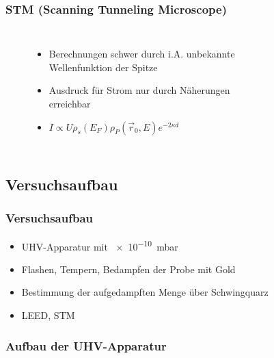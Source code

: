 \documentclass{beamer}
\begin{document}
\begin{frame}
\frametitle{STM (Scanning Tunneling Microscope)}
	 \begin{columns}
\begin{figure}[H]
\begin{center}
\begin{itemize}\setlength{\itemsep}{+15pt}
		  \item Berechnungen schwer durch i.A. unbekannte Wellenfunktion der Spitze
		  \item Ausdruck für Strom nur durch Näherungen erreichbar
		  \item $I\propto U \rho_{s}(E_F) \rho_P(\vec{r}_0, E)e^{-2\kappa d}$
		\end{itemize}
\end{center}
\end{figure}

\begin{figure}[H]
\begin{center}

\end{center}
\end{figure}
\end{columns}
\end{frame}



\subsection[Versuchsaufbau]{Versuchsaufbau}

\begin{frame}
\frametitle{Versuchsaufbau}
\begin{itemize}\setlength{\itemsep}{+15pt}
  \item UHV-Apparatur mit \SI{e-10}{mbar}
  \item Flashen, Tempern, Bedampfen der Probe mit Gold
  \item Bestimmung der aufgedampften Menge über Schwingquarz
  \item LEED, STM
\end{itemize}
\end{frame}

\begin{frame}
\frametitle{Aufbau der UHV-Apparatur}
\begin{figure}[H]
\centering
\sffamily

\end{figure}
\end{frame}
\end{document}
